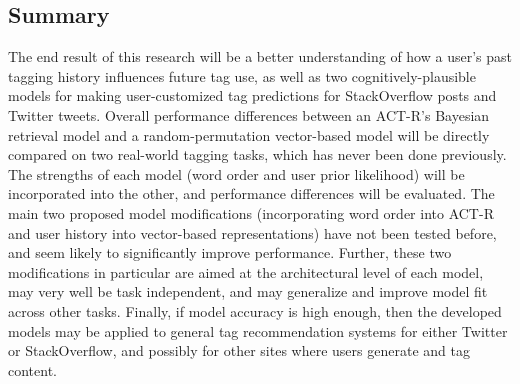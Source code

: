 \documentclass[man,floatsintext,donotrepeattitle]{apa6}
\begin{document}
\subsection{Summary}

The end result of this research will be a better understanding of how a user's past tagging history influences future tag use,
as well as two cognitively-plausible models for making user-customized tag predictions for StackOverflow posts and Twitter tweets. 
Overall performance differences between an ACT-R's Bayesian retrieval model and a random-permutation vector-based model will be directly compared on two real-world tagging tasks, which has never been done previously.
The strengths of each model (word order and user prior likelihood) will be incorporated into the other, and performance differences will be evaluated.
The main two proposed model modifications (incorporating word order into ACT-R and user history into vector-based representations) have not been tested before, and seem likely to significantly improve performance.
Further, these two modifications in particular are aimed at the architectural level of each model, may very well be task independent, and may generalize and improve model fit across other tasks.
Finally, if model accuracy is high enough, then the developed models may be applied to general tag recommendation systems for either Twitter or StackOverflow,
and possibly for other sites where users generate and tag content.

\begingroup
{}
\setlength\bibitemsep{12pt}
\clearpage
\printbibliography[heading=bibintoc]
\endgroup
\end{document}
